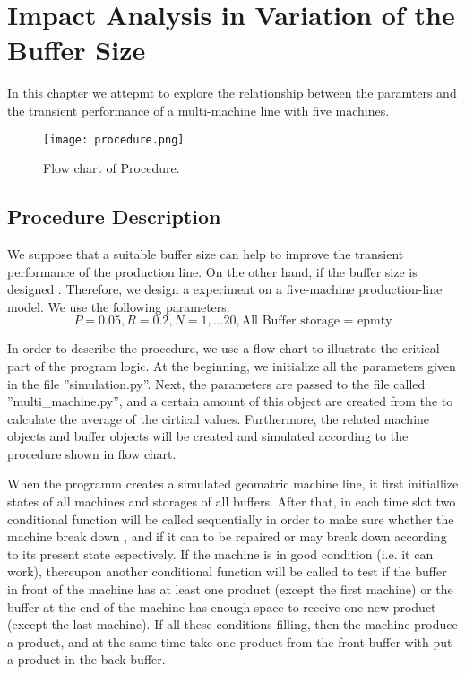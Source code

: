\chapter{Impact Analysis in Variation of the Buffer Size}
\label{D_Kapitel}
\noindent In this chapter we attepmt to explore the relationship between the  paramters and the transient performance of a multi-machine line with five machines. 

\begin{figure*}[!h]
    \centering
		\texttt{[image: procedure.png]}	
	\caption{Flow chart of Procedure.}
    \label{flow chart}
\end{figure*}
\section{Procedure Description}
\noindent We suppose that a suitable buffer size can help to improve the transient performance of the production line. On the other hand, if the buffer size is designed . Therefore, we design a experiment on a five-machine production-line model. We use the following parameters:
\begin{displaymath}
    P = 0.05, R = 0.2, N = 1,...20, \text{All Buffer storage = epmty}
\end{displaymath}

In order to describe the procedure, we use a flow chart to illustrate the critical part of the program logic. At the beginning, we initialize all the parameters given in the file ''simulation.py''. Next, the parameters are passed to the file called ''multi\_machine.py'', and a certain amount of this object are created from the  to calculate the average of the cirtical values. Furthermore, the related machine objects and buffer objects will be created and simulated according to the procedure shown in flow chart. 

When the programm creates a simulated geomatric machine line, it first initiallize states of all machines and storages of all buffers. After that, in each time slot two conditional function will be called sequentially in order to make sure whether the machine break down , and if it can to be repaired or may break down according to its present state espectively. If the machine is in good condition (i.e. it can work), thereupon another conditional function will be called to test if the buffer in front of the machine has at least one product (except the first machine) or the buffer at the end of the machine has enough space to receive one new product (except the last machine). If all these conditions filling, then the machine produce a product, and at the same time take one product from the front buffer with put a product in the back buffer.

